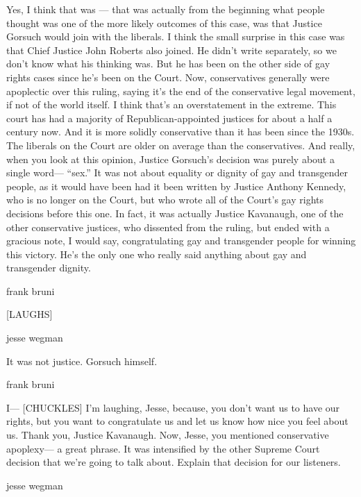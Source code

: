 Yes, I think that was --- that was actually from the beginning what
people thought was one of the more likely outcomes of this case, was
that Justice Gorsuch would join with the liberals. I think the small
surprise in this case was that Chief Justice John Roberts also joined.
He didn't write separately, so we don't know what his thinking was. But
he has been on the other side of gay rights cases since he's been on the
Court. Now, conservatives generally were apoplectic over this ruling,
saying it's the end of the conservative legal movement, if not of the
world itself. I think that's an overstatement in the extreme. This court
has had a majority of Republican-appointed justices for about a half a
century now. And it is more solidly conservative than it has been since
the 1930s. The liberals on the Court are older on average than the
conservatives. And really, when you look at this opinion, Justice
Gorsuch's decision was purely about a single word--- ``sex.'' It was not
about equality or dignity of gay and transgender people, as it would
have been had it been written by Justice Anthony Kennedy, who is no
longer on the Court, but who wrote all of the Court's gay rights
decisions before this one. In fact, it was actually Justice Kavanaugh,
one of the other conservative justices, who dissented from the ruling,
but ended with a gracious note, I would say, congratulating gay and
transgender people for winning this victory. He's the only one who
really said anything about gay and transgender dignity.

frank bruni

{[}LAUGHS{]}

jesse wegman

It was not justice. Gorsuch himself.

frank bruni

I--- {[}CHUCKLES{]} I'm laughing, Jesse, because, you don't want us to
have our rights, but you want to congratulate us and let us know how
nice you feel about us. Thank you, Justice Kavanaugh. Now, Jesse, you
mentioned conservative apoplexy--- a great phrase. It was intensified by
the other Supreme Court decision that we're going to talk about. Explain
that decision for our listeners.

jesse wegman

